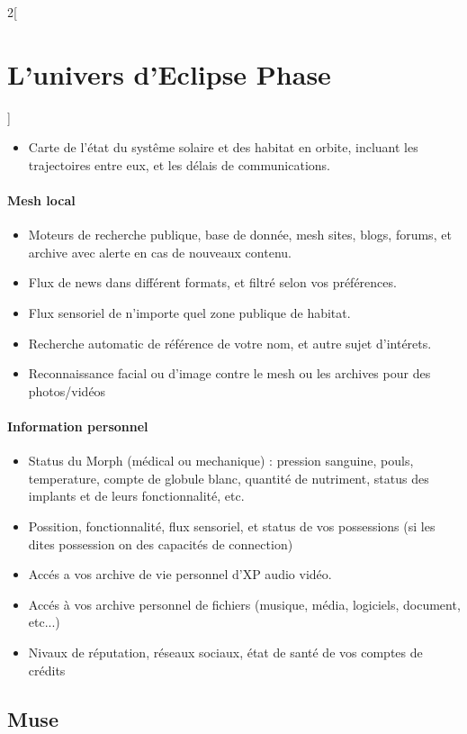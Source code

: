 \documentclass[a4paper,9pt]{article}
\begin{document}
\begin{multicols}{2}[\section{L'univers d'Eclipse Phase}]
\begin{itemize}
   \item Carte de l'état du systême solaire et des habitat en orbite, incluant les
   trajectoires entre eux, et les délais de communications.
\end{itemize}

\paragraph{Mesh local}
\begin{itemize}
   \item Moteurs de recherche publique, base de donnée, mesh sites, blogs, forums, et archive
   avec alerte en cas de nouveaux contenu.
   \item Flux de news dans différent formats, et filtré selon vos préférences.
   \item Flux sensoriel de n'importe quel zone publique de habitat.
   \item Recherche automatic de référence de votre nom, et autre sujet d'intérets.
   \item Reconnaissance facial ou d'image contre le mesh ou les archives pour des photos/vidéos
\end{itemize}

\paragraph{Information personnel}
\begin{itemize}
   \item Status du Morph (médical ou mechanique) : pression sanguine, pouls, temperature, compte
   de globule blanc, quantité de nutriment, status des implants et de leurs fonctionnalité, etc. 
   \item Possition, fonctionnalité, flux sensoriel, et status de vos possessions (si les dites 
   possession on des capacités de connection)
   \item Accés a vos archive de vie personnel d'XP audio vidéo.
   \item Accés à vos archive personnel de fichiers (musique, média, logiciels, document, etc...)
   \item Nivaux de réputation, réseaux sociaux, état de santé de vos comptes de crédits
\end{itemize}

\subsection{Muse}


\end{multicols}
\end{document}
